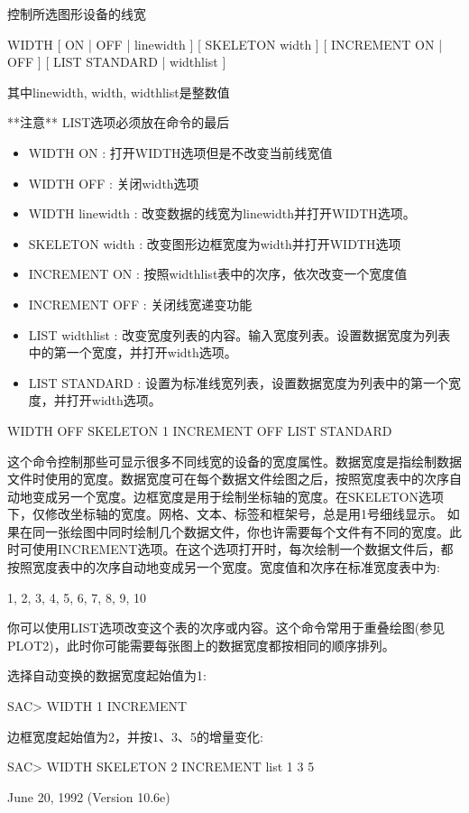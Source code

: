 \label{cmd:width}

控制所选图形设备的线宽

WIDTH  [ ON | OFF | linewidth ] [ SKELETON width ] [ INCREMENT ON | OFF ] [ LIST STANDARD | widthlist ]

其中linewidth, width, widthlist是整数值

**注意** LIST选项必须放在命令的最后

\begin{itemize}
\item WIDTH ON : 打开WIDTH选项但是不改变当前线宽值 
\item WIDTH OFF : 关闭width选项 
\item WIDTH linewidth : 改变数据的线宽为linewidth并打开WIDTH选项。 
\item SKELETON width : 改变图形边框宽度为width并打开WIDTH选项 
\item INCREMENT {ON} : 按照widthlist表中的次序，依次改变一个宽度值 
\item INCREMENT OFF : 关闭线宽递变功能 
\item LIST widthlist : 改变宽度列表的内容。输入宽度列表。设置数据宽度为列表中的第一个宽度，并打开width选项。 
\item LIST STANDARD : 设置为标准线宽列表，设置数据宽度为列表中的第一个宽度，并打开width选项。 
\end{itemize}

WIDTH OFF SKELETON 1 INCREMENT OFF LIST STANDARD

这个命令控制那些可显示很多不同线宽的设备的宽度属性。数据宽度是指绘制数据文件时使用的宽度。数据宽度可在每个数据文件绘图之后，按照宽度表中的次序自动地变成另一个宽度。边框宽度是用于绘制坐标轴的宽度。在SKELETON选项下，仅修改坐标轴的宽度。网格、文本、标签和框架号，总是用1号细线显示。
如果在同一张绘图中同时绘制几个数据文件，你也许需要每个文件有不同的宽度。此时可使用INCREMENT选项。在这个选项打开时，每次绘制一个数据文件后，都按照宽度表中的次序自动地变成另一个宽度。宽度值和次序在标准宽度表中为:
\begin{SACCode}
1, 2, 3, 4, 5, 6, 7, 8, 9, 10
\end{SACCode}
你可以使用LIST选项改变这个表的次序或内容。这个命令常用于重叠绘图(参见PLOT2)，此时你可能需要每张图上的数据宽度都按相同的顺序排列。

选择自动变换的数据宽度起始值为1:
\begin{SACCode}
SAC> WIDTH 1 INCREMENT
\end{SACCode}

边框宽度起始值为2，并按1、3、5的增量变化:
\begin{SACCode}
SAC> WIDTH SKELETON 2 INCREMENT list 1 3 5
\end{SACCode}

June 20, 1992 (Version 10.6e)

